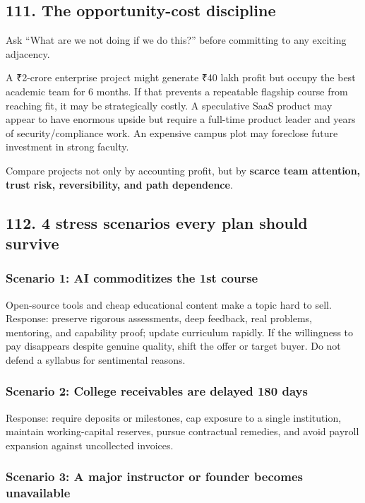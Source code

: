 \subsection{111. The opportunity-cost discipline}

Ask ``What are we not doing if we do this?'' before committing to any exciting adjacency.

A \textnormal{₹}2-crore enterprise project might generate \textnormal{₹}40 lakh profit but occupy the best academic team for 6 months. If that prevents a repeatable flagship course from reaching fit, it may be strategically costly. A speculative SaaS product may appear to have enormous upside but require a full-time product leader and years of security/\allowbreak compliance work. An expensive campus plot may foreclose future investment in strong faculty.

Compare projects not only by accounting profit, but by \textbf{scarce team attention, trust risk, reversibility, and path dependence}.

\subsection{112. 4 stress scenarios every plan should survive}

\subsubsection*{Scenario 1: AI commoditizes the 1st course}

Open-source tools and cheap educational content make a topic hard to sell. Response: preserve rigorous assessments, deep feedback, real problems, mentoring, and capability proof; update curriculum rapidly. If the willingness to pay disappears despite genuine quality, shift the offer or target buyer. Do not defend a syllabus for sentimental reasons.

\subsubsection*{Scenario 2: College receivables are delayed 180 days}

Response: require deposits or milestones, cap exposure to a single institution, maintain working-capital reserves, pursue contractual remedies, and avoid payroll expansion against uncollected invoices.

\subsubsection*{Scenario 3: A major instructor or founder becomes unavailable}


